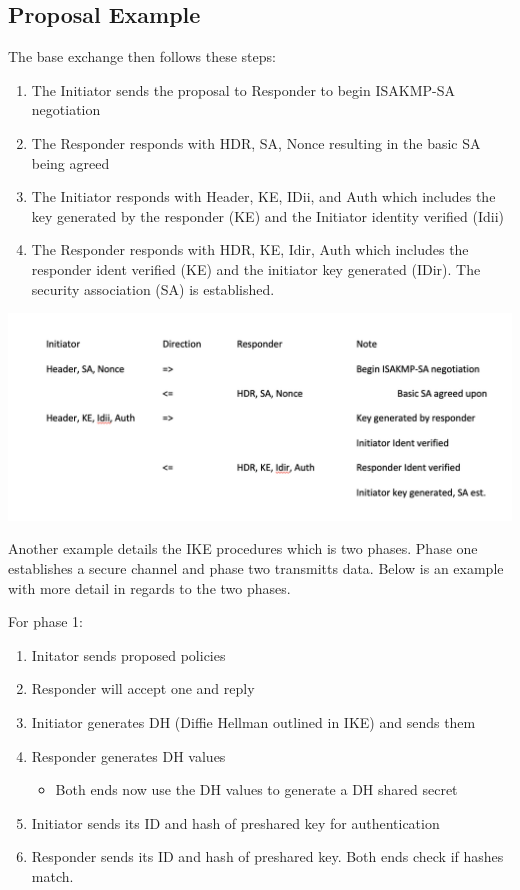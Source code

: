 \documentclass{report}
\newcommand{\squash}{\itemsep=0pt\parskip=0pt}
\begin{document}
\begin{itemize}
\section {Proposal Example}


The base exchange then follows these steps:

\begin{enumerate}
\squash
\item The Initiator sends the proposal to Responder to begin ISAKMP-SA negotiation
\item The Responder responds with HDR, SA, Nonce resulting in the basic SA being agreed 
\item The Initiator responds with Header, KE, IDii, and Auth which includes the key generated by the responder (KE) and the Initiator identity verified (Idii)
\item The Responder responds with HDR, KE, Idir, Auth which includes the responder ident verified (KE) and the initiator key generated (IDir). The security association (SA) is established. 
\end{enumerate}

\includegraphics[width=\textwidth] {ISAKMP_Neg_Procedure}

Another example details the IKE procedures which is two phases. Phase one establishes a secure channel and phase two transmitts data. Below is an example  with more detail in regards to the two phases.

For phase 1:
\begin{enumerate}
\item Initator sends proposed policies
\item Responder will accept one and reply
\item Initiator generates DH (Diffie Hellman outlined in IKE) and sends them
\item Responder generates DH values
  \begin{itemize}
  \item Both ends now use the DH values to generate a DH shared secret
  \end{itemize}
\item Initiator sends its ID and hash of preshared key for authentication
\item Responder sends its ID and hash of preshared key. Both ends check if hashes match.
\end{enumerate}


\end{itemize}
\end{document}
